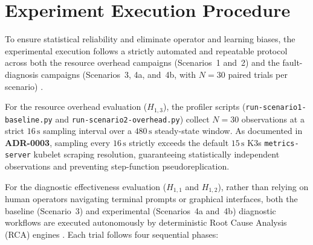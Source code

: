 \section{Experiment Execution Procedure}
\label{sec:execution-procedure}

To ensure statistical reliability and eliminate operator and learning biases, the experimental execution follows a strictly automated and repeatable protocol across both the resource overhead campaigns (Scenarios~1 and~2) and the fault-diagnosis campaigns (Scenarios~3, 4a, and~4b, with $N=30$ paired trials per scenario) \cite{wohlin_2012}.

For the resource overhead evaluation ($H_{1,3}$), the profiler scripts (\texttt{run-scenario1-baseline.py} and \texttt{run-scenario2-overhead.py}) collect $N=30$ observations at a strict $16\,\text{s}$ sampling interval over a $480\,\text{s}$ steady-state window. As documented in \textbf{ADR-0003}, sampling every $16\,\text{s}$ strictly exceeds the default $15\,\text{s}$ K3s \texttt{metrics-server} kubelet scraping resolution, guaranteeing statistically independent observations and preventing step-function pseudoreplication.

For the diagnostic effectiveness evaluation ($H_{1,1}$ and $H_{1,2}$), rather than relying on human operators navigating terminal prompts or graphical interfaces, both the baseline (Scenario~3) and experimental (Scenarios~4a and~4b) diagnostic workflows are executed autonomously by deterministic Root Cause Analysis (RCA) engines \cite{wang_2024, barata_2026}. Each trial follows four sequential phases:

